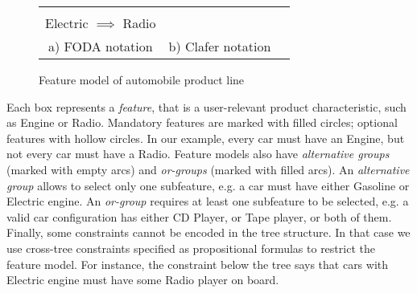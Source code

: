 \documentclass{llncs}
\begin{document}
\begin{figure}[t]
  \begin{center}
    \begin{tabular}{ccc}
      \begin{minipage}[t]{8cm}
        \begin{center}
          \scalebox{1.0}{
            \begin{fbundle}{\featbox{Automobile}}
              \fchunk[m]{
                \begin{fbundle}[x][1]{\featbox{Engine}}
                  \fchunk{\featbox{Gasoline}}
                  \fchunk{\featbox{Electric}}
                \end{fbundle}
              }
              \fchunk[o]{
                \begin{fbundle}[o][1]{\featbox{Radio}}
                  \fchunk{\featbox{CD Player}}
                  \fchunk{\featbox{Tape}}
                \end{fbundle}
              }
            \end{fbundle}
          }
        \end{center}
      \end{minipage}
      &
      \begin{minipage}{3cm}
        
      \end{minipage}\\
      \textsf{Electric} $\implies$ \textsf{Radio}
      &
      \\[0.2cm]
      a) FODA notation & b) Clafer notation
    \end{tabular}
  \end{center}
  \caption{Feature model of automobile product line\label{fig:autofm}}
\end{figure}

Each box represents a \emph{feature}, that is a user-relevant product characteristic, such as \textsf{Engine} or \textsf{Radio}. Mandatory features are marked with filled circles; optional features with hollow circles. In our example, every car must have an \textsf{Engine}, but not every car must have a \textsf{Radio}. Feature models also have \emph{alternative groups} (marked with empty arcs) and \emph{or-groups} (marked with filled arcs). An \emph{alternative group} allows to select only one subfeature, e.g. a car must have either \textsf{Gasoline} or \textsf{Electric} engine. An \emph{or-group} requires at least one subfeature to be selected, e.g. a valid car configuration has either \textsf{CD Player}, or \textsf{Tape} player, or both of them. Finally, some constraints cannot be encoded in the tree structure. In that case we use cross-tree constraints specified as propositional formulas to restrict the feature model. For instance, the constraint below the tree says that cars with \textsf{Electric} engine must have some \textsf{Radio} player on board.
\end{document}

